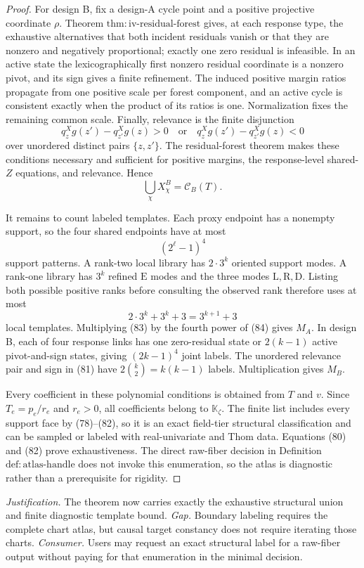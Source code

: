 \documentclass{article}
\begin{document}
\begin{proof}
For design B, fix a design-A cycle point and a positive projective coordinate \(\rho\).  Theorem \(\mathrm{thm{:}iv\text{-}residual\text{-}forest}\) gives, at each response type, the exhaustive alternatives that both incident residuals vanish or that they are nonzero and negatively proportional; exactly one zero residual is infeasible.  In an active state the lexicographically first nonzero residual coordinate is a nonzero pivot, and its sign gives a finite refinement.  The induced positive margin ratios propagate from one positive scale per forest component, and an active cycle is consistent exactly when the product of its ratios is one.  Normalization fixes the remaining common scale.  Finally, relevance is the finite disjunction
\[
 q^X_zg(z')-q^X_{z'}g(z)>0
 \quad\text{or}\quad
 q^X_zg(z')-q^X_{z'}g(z)<0                               \tag{81}
\]
over unordered distinct pairs \(\{z,z'\}\).  The residual-forest theorem makes these conditions necessary and sufficient for positive margins, the response-level shared-\(Z\) equations, and relevance.  Hence
\[
 \bigcup_{\chi}X^B_{\chi}=\mathcal C_B(T).               \tag{82}
\]

It remains to count labeled templates.  Each proxy endpoint has a nonempty support, so the four shared endpoints have at most
\[
 (2^{\ell}-1)^4                                           \tag{83}
\]
support patterns.  A rank-two local library has \(2\cdot3^k\) oriented support modes.  A rank-one library has \(3^k\) refined \(\mathrm E\) modes and the three modes \(\mathrm L,\mathrm R,\mathrm D\).  Listing both possible positive ranks before consulting the observed rank therefore uses at most
\[
 2\cdot3^k+3^k+3=3^{k+1}+3                               \tag{84}
\]
local templates.  Multiplying (83) by the fourth power of (84) gives \(M_A\).  In design B, each of four response links has one zero-residual state or \(2(k-1)\) active pivot-and-sign states, giving \((2k-1)^4\) joint labels.  The unordered relevance pair and sign in (81) have \(2\binom{k}{2}=k(k-1)\) labels.  Multiplication gives \(M_B\).

Every coefficient in these polynomial conditions is obtained from \(T\) and \(v\).  Since \(T_e=p_e/r_e\) and \(r_e>0\), all coefficients belong to \(\mathbb K_{\zeta}\).  The finite list includes every support face by (78)--(82), so it is an exact field-tier structural classification and can be sampled or labeled with real-univariate and Thom data.  Equations (80) and (82) prove exhaustiveness.  The direct raw-fiber decision in Definition \(\mathrm{def{:}atlas\text{-}handle}\) does not invoke this enumeration, so the atlas is diagnostic rather than a prerequisite for rigidity.
\end{proof}
\par\smallskip\noindent \textit{Justification.} The theorem now carries exactly the exhaustive structural union and finite diagnostic template bound. \textit{Gap.} Boundary labeling requires the complete chart atlas, but causal target constancy does not require iterating those charts. \textit{Consumer.} Users may request an exact structural label for a raw-fiber output without paying for that enumeration in the minimal decision.
\end{document}
